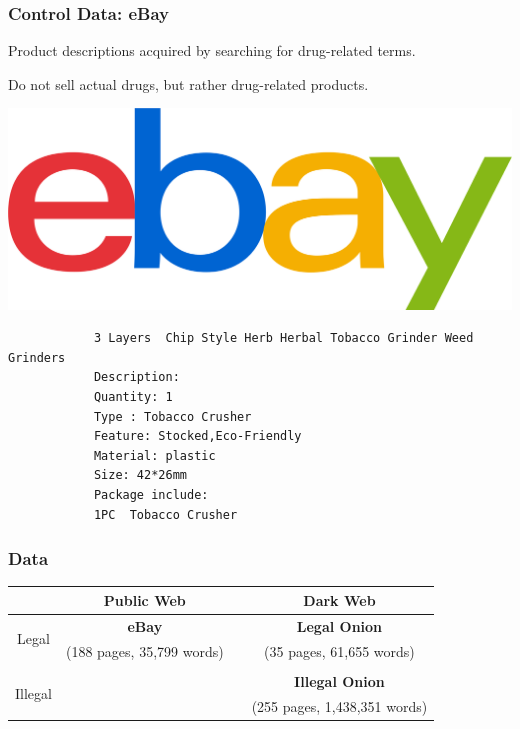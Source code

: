 \documentclass[t,xcolor={svgnames,table}]{beamer}
\begin{document}
\begin{frame}[fragile]
	\frametitle{Control Data: eBay}
	Product descriptions acquired by searching for drug-related terms.
	\vfill
	
	Do not sell actual drugs, but rather drug-related products.
	\vfill
	
	\begin{center}
	\includegraphics[width=.5\textwidth]{ebay.png}
	\end{center}
	\vfill
	
	\small
	\begin{center}\color{green}
		\begin{verbatim}
			3 Layers  Chip Style Herb Herbal Tobacco Grinder Weed Grinders
			Description:
			Quantity: 1
			Type : Tobacco Crusher
			Feature: Stocked,Eco-Friendly
			Material: plastic
			Size: 42*26mm
			Package include:
			1PC  Tobacco Crusher
		\end{verbatim}
	\end{center}
\end{frame}

\begin{frame}
	\frametitle{Data}
	
	\begin{center}
	\def\arraystretch{2}
	\begin{tabular}{c|ccc}
	& Public Web && Dark Web \\ 
	\hline
	\multirow{2}{*}{Legal} & \textbf{\color{yellow} eBay} && \textbf{\color{green} Legal Onion} \\
	& (188 pages, 35,799 words) && (35 pages, 61,655 words) \\\\
	\multirow{2}{*}{Illegal} &&& \textbf{\color{red} Illegal Onion} \\
	&&& (255 pages, 1,438,351 words)
	\end{tabular}
	\end{center}
\end{frame}
\end{document}
